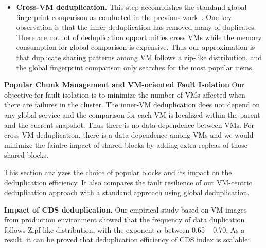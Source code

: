 \begin{itemize}
\item \textbf{Cross-VM deduplication.}
This step accomplishes the standand global fingerprint  comparison as conducted
in the previous work~\cite{??}.
One key observation is that the inner deduplication has removed many of duplicates.
There are not lot of deduplication opportunities cross VMs while the memory
consumption for global comparison is expensive.
Thus our approximation is that duplicate sharing patterns among  VM follows
a zip-like distribution, and the global fingerprint  comparison  only searches
for the most popular items. 
\end{itemize}

{\bf Popular Chunk Management and VM-oriented Fault Isolation}
Our objective for fault isolation is to minimize the number of VMs affected when there are failures
in the cluster.  The inner-VM deduplication does not depend on any global service and the comparison
for each VM is localized within the parent and the current snapshot.
Thus there is no data dependence between VMs.
For cross-VM deduplication, there is a data dependence among VMs and we would minimize the faiulre impact
of shared blocks by adding extra replcas of those shared blocks.

This section analyzes the choice of popular blocks and its impact on the deduplication efficiency.
It also  compares the  fault resilience of our VM-centric deduplication approach with a standand approach using 
global deduplication.


{\bf Impact of CDS deduplication.}
Our empirical study based on VM images from production environment\cite{ieeecloud} showed that the
frequency of data duplication follows Zipf-like distribution\cite{zipf},
with the exponent $\alpha$ between 0.65 ~ 0.70.
As a result, it can be proved that deduplication efficiency of CDS index is scalable:

